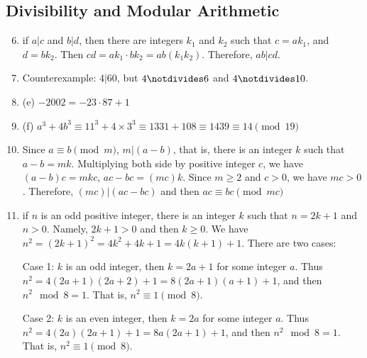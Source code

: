 \documentclass{article}
\begin{document}
\subsection{Divisibility and Modular Arithmetic}
\begin{enumerate}
    \setcounter{enumi}{5}
    \item if $a|c$ and $b|d$, then there are integers $k_1$ and $k_2$ such that $c = ak_1$, and $d = bk_2$. Then $cd = ak_1 \cdot bk_2 = ab(k_1k_2)$. Therefore, $ab|cd$.
    
    \setcounter{enumi}{7}
    \item Counterexample: $4|60$, but $4 \notdivides 6$ and $4 \notdivides 10$.
    
    \setcounter{enumi}{9}
    \item (e) $-2002 = -23 \cdot 87 + 1$
    
    \setcounter{enumi}{13}
    \item (f) $a^3+4b^3 \equiv 11^3+4\times3^3 \equiv 1331+108 \equiv 1439 \equiv 14 \pmod{19}$
    
    \setcounter{enumi}{35}
    \item Since $a \equiv b \pmod{m}$, $m | (a-b)$, that is, there is an integer $k$ such that $a-b = mk$. Multiplying both side by positive integer $c$, we have $(a-b)c = mkc$, $ac - bc = (mc)k$. Since $m \geq 2$ and $c > 0$, we have $mc > 0$. Therefore, $(mc) | (ac-bc)$ and then $ac \equiv bc \pmod{mc}$
    
    \setcounter{enumi}{39}
    \item if $n$ is an odd positive integer, there is an integer $k$ such that $n = 2k+1$ and $n > 0$. Namely, $2k+1>0$ and then $k \geq 0$. We have $n^2 = (2k+1)^2 = 4k^2 + 4k + 1 = 4k(k+1)+1$. There are two cases:
    
    Case 1: $k$ is an odd integer, then $k = 2a+1$ for some integer $a$. Thus $n^2 = 4(2a+1)(2a+2)+1 = 8(2a+1)(a+1)+1$, and then $n^2 \mod 8 = 1$. That is, $n^2 \equiv 1 \pmod{8}$.
    
    Case 2: $k$ is an even integer, then $k = 2a$ for some integer $a$. Thus $n^2 = 4(2a)(2a+1)+1 = 8a(2a+1)+1$, and then $n^2 \mod 8 = 1$. That is, $n^2 \equiv 1 \pmod{8}$.
    
\end{enumerate}
\end{document}
